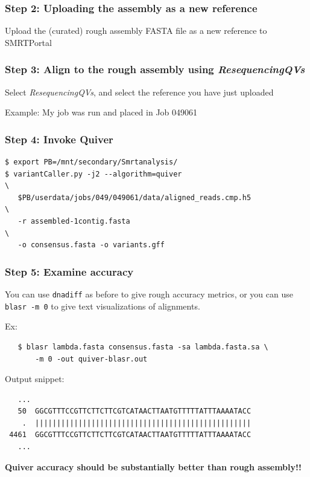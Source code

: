\documentclass[11pt,serif]{beamer}
\begin{document}
\begin{frame}[fragile]\frametitle{Step 2: Uploading the assembly as a new reference}
\label{sec-3-4}

Upload the (curated) rough assembly FASTA file as a new reference to SMRTPortal
\end{frame}
\begin{frame}[fragile]\frametitle{Step 3: Align to the rough assembly using \emph{ResequencingQVs}}
\label{sec-3-5}

Select \emph{ResequencingQVs}, and select the reference you have just uploaded \newline

Example: My job was run and placed in Job 049061
\end{frame}
\begin{frame}[fragile]\frametitle{Step 4: Invoke Quiver}
\label{sec-3-6}

\begin{scriptsize}
\begin{verbatim}
$ export PB=/mnt/secondary/Smrtanalysis/
$ variantCaller.py -j2 --algorithm=quiver                                 \
   $PB/userdata/jobs/049/049061/data/aligned_reads.cmp.h5                 \
   -r assembled-1contig.fasta                                             \
   -o consensus.fasta -o variants.gff
\end{verbatim}
\end{scriptsize}
\end{frame}
\begin{frame}[fragile]\frametitle{Step 5: Examine accuracy}
\label{sec-3-7}

   You can use \verb~dnadiff~ as before to give rough accuracy metrics, or
   you can use \verb~blasr -m 0~ to give text visualizations of alignments.

   \newline
   Ex:
   \begin{scriptsize}
   \begin{verbatim}
   $ blasr lambda.fasta consensus.fasta -sa lambda.fasta.sa \
       -m 0 -out quiver-blasr.out
   \end{verbatim}
   \end{scriptsize}

   \newline
   Output snippet:

   \begin{scriptsize}
   \begin{verbatim}
   ...
   50  GGCGTTTCCGTTCTTCTTCGTCATAACTTAATGTTTTTATTTAAAATACC
    .  ||||||||||||||||||||||||||||||||||||||||||||||||||
 4461  GGCGTTTCCGTTCTTCTTCGTCATAACTTAATGTTTTTATTTAAAATACC
   ...
   \end{verbatim}
   \end{scriptsize}

   \textbf{Quiver accuracy should be substantially better than rough     assembly!!}
\end{frame}
\end{document}
